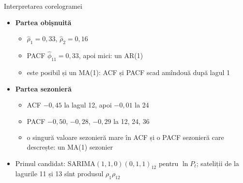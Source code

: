 \begin{frame}{Interpretarea corelogramei}
\itemsize{\small}
\begin{itemize}
    \item \textbf{Partea obișnuită}
    \begin{itemize}
        \item $\hat\rho_1 = 0{,}33$, $\hat\rho_2 = 0{,}16$
        \item PACF $\hat\phi_{11} = 0{,}33$, apoi mici: un AR(1)
        \item este posibil și un MA(1): ACF și PACF scad amîndouă după lagul 1
    \end{itemize}
    \item \textbf{Partea sezonieră}
    \begin{itemize}
        \item ACF $\ensuremath{-}0{,}45$ la lagul 12, apoi $\ensuremath{-}0{,}01$ la 24
        \item PACF $\ensuremath{-}0{,}50$, $\ensuremath{-}0{,}28$, $\ensuremath{-}0{,}29$ la 12, 24, 36
        \item o singură valoare sezonieră mare în ACF și o PACF sezonieră care descrește: un MA(1) sezonier
    \end{itemize}
    \item Primul candidat: SARIMA$(1,1,0)(0,1,1)_{12}$ pentru $\ln P_t$; sateliții de la lagurile 11 și 13 sînt produsul $\rho_1\rho_{12}$
\end{itemize}
\end{frame}

